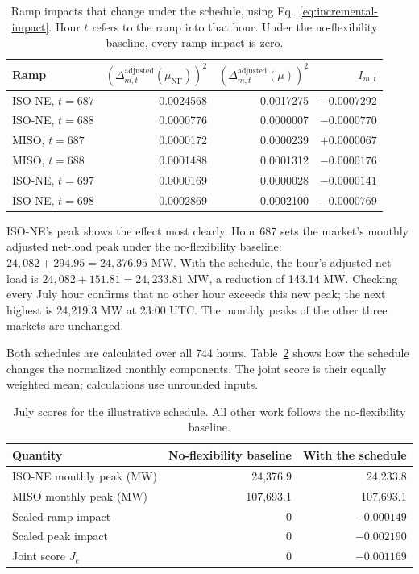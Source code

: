 \documentclass{UNCC-thesis}
\begin{document}
\begin{table}[htbp]
  \centering
  \footnotesize
  \caption[Ramp impacts that change under the schedule]{Ramp impacts that change under the schedule, using
  Eq.~\eqref{eq:incremental-impact}. Hour \(t\) refers to the ramp into that hour. Under
  the no-flexibility baseline, every ramp impact is zero.}
  \label{tab:joint-example-hour}
  \begin{tabular}{@{}lrrr@{}}
    \toprule
    Ramp & \(\left(\Delta^{\mathrm{adjusted}}_{m,t}(\mu_{\mathrm{NF}})\right)^2\)
      & \(\left(\Delta^{\mathrm{adjusted}}_{m,t}(\mu)\right)^2\) & \(I_{m,t}\) \\
    \midrule
    ISO-NE, \(t=687\) & 0.0024568 & 0.0017275 & \(-0.0007292\) \\
    ISO-NE, \(t=688\) & 0.0000776 & 0.0000007 & \(-0.0000770\) \\
    MISO, \(t=687\)   & 0.0000172 & 0.0000239 & \(+0.0000067\) \\
    MISO, \(t=688\)   & 0.0001488 & 0.0001312 & \(-0.0000176\) \\
    ISO-NE, \(t=697\) & 0.0000169 & 0.0000028 & \(-0.0000141\) \\
    ISO-NE, \(t=698\) & 0.0002869 & 0.0002100 & \(-0.0000769\) \\
    \bottomrule
  \end{tabular}
\end{table}

ISO-NE's peak shows the effect most clearly. Hour 687 sets the market's monthly adjusted
net-load peak under the no-flexibility baseline: \(24{,}082+294.95=24{,}376.95\) MW.
With the schedule, the hour's adjusted net load is \(24{,}082+151.81=24{,}233.81\) MW, a
reduction of 143.14 MW. Checking every July hour confirms that no other hour exceeds
this new peak; the next highest is 24,219.3 MW at 23:00 UTC. The monthly peaks of the
other three markets are unchanged.

Both schedules are calculated over all 744 hours.
Table~\ref{tab:joint-example-month} shows how the schedule changes
the normalized monthly components. The joint score is their equally
weighted mean; calculations use unrounded inputs.

\begin{table}[htbp]
  \centering
  \footnotesize
  \caption[July scores for the illustrative schedule]{July scores for the illustrative schedule. All other work
  follows the no-flexibility baseline.}
  \label{tab:joint-example-month}
  \begin{tabular}{@{}lrr@{}}
    \toprule
    Quantity & No-flexibility baseline & With the schedule \\
    \midrule
    ISO-NE monthly peak (MW) & 24,376.9 & 24,233.8 \\
    MISO monthly peak (MW) & 107,693.1 & 107,693.1 \\
    Scaled ramp impact & 0 & \(-0.000149\) \\
    Scaled peak impact & 0 & \(-0.002190\) \\
    Joint score \(J_e\) & 0 & \(-0.001169\) \\
    \bottomrule
  \end{tabular}
\end{table}
\end{document}
